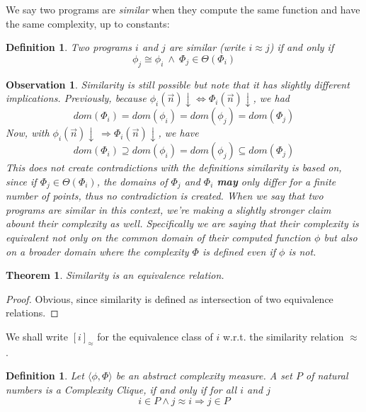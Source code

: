 \documentclass[10pt, a4paper, oneside, titlepage, draft]{article}
\newtheorem{definition}[shrd]{Definition}
\newtheorem{observation}{Observation}[shrd]
\newtheorem{theorem}[shrd]{Theorem}
\begin{document}
We say two programs are \emph{similar} when they compute the same function and have the same complexity, up to constants:

\begin{definition}
    Two programs $i$ and $j$ are similar (write $i \approx j$) if and only if
    \begin{equation*}
        \phi_j \cong \phi_i \ \wedge \ \Phi_j \in \Theta(\Phi_i)
    \end{equation*}
\end{definition}

\begin{observation}
    Similarity is still possible but note that it has slightly different implications. Previously, because $\phi_i(\vec{n})\downarrow \iff \Phi_i(\vec{n})\downarrow$, we had
    \begin{equation*}
        dom(\Phi_i) = dom(\phi_i) = dom(\phi_j) = dom(\Phi_j)
    \end{equation*}
    Now, with $\phi_i(\vec{n}) \downarrow \ \Rightarrow \Phi_i(\vec{n})\downarrow$, we have
    \begin{equation*}
        dom(\Phi_i) \supseteq dom(\phi_i) = dom(\phi_j) \subseteq dom(\Phi_j)
    \end{equation*}
    This does not create contradictions with the definitions similarity is based on, since if $\Phi_j \in \Theta(\Phi_i)$, the domains of $\Phi_j$ and $\Phi_i$ \textbf{may} only differ for a finite number of points, thus no contradiction is created.
    When we say that two programs are similar in this context, we're making a slightly stronger claim abount their complexity as well. Specifically we are saying that their complexity is equivalent not only on the common domain of their computed function $\phi$ but also on a broader domain where the complexity $\Phi$ is defined even if $\phi$ is not.
\end{observation}

\begin{theorem}
    Similarity is an equivalence relation.
\end{theorem}

\begin{proof}
    Obvious, since similarity is defined as intersection of two equivalence relations.
\end{proof}

\noindent We shall write $[ i ]_{\approx}$ for the equivalence class of $i$ w.r.t. the similarity relation $\approx$.

\begin{definition}
    Let $\langle \phi, \Phi \rangle$ be an abstract complexity measure. A set $P$ of natural numbers is a \emph{Complexity Clique}, if and only if for all $i$ and $j$
    \begin{equation*}
        i \in P \wedge j \approx i \Rightarrow j \in P
    \end{equation*}
\end{definition}
\end{document}
